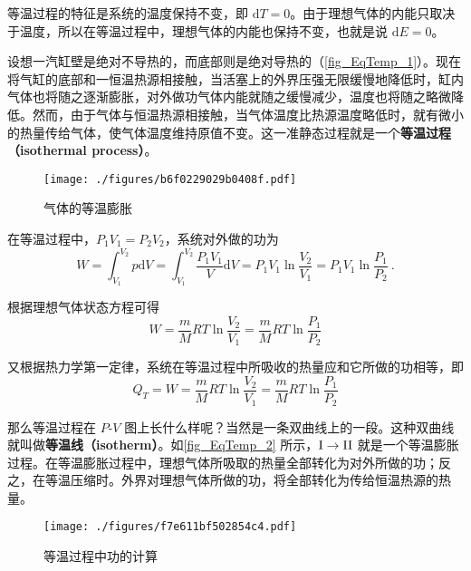 

等温过程的特征是系统的温度保持不变，即 $\mathrm dT=0$。由于理想气体的内能只取决于温度，所以在等温过程中，理想气体的内能也保持不变，也就是说 $\mathrm dE=0$。

设想一汽缸壁是绝对不导热的，而底部则是绝对导热的（\autoref{fig_EqTemp_1}）。现在将气缸的底部和一恒温热源相接触，当活塞上的外界压强无限缓慢地降低时，缸内气体也将随之逐渐膨胀，对外做功气体内能就随之缓慢减少，温度也将随之略微降低。然而，由于气体与恒温热源相接触，当气体温度比热源温度略低时，就有微小的热量传给气体，使气体温度维持原值不变。这一准静态过程就是一个\textbf{等温过程（isothermal process）}。
\begin{figure}[ht]
\centering
\texttt{[image: ./figures/b6f0229029b0408f.pdf]}
\caption{气体的等温膨胀} \label{fig_EqTemp_1}
\end{figure}

在等温过程中，$P_1V_1=P_2V_2$，系统对外做的功为
\begin{equation}
W= \int_{V_{1}}^{V_{2}} p \mathrm{d} V=\int_{V_{1}}^{V_{2}} \frac{P_{1} V_{1}}{V} \mathrm{d} V=P_{1} V_{1} \ln \frac{V_{2}}{V_{1}}=P_{1} V_{1} \ln \frac{P_{1}}{P_{2}}~.
\end{equation}

根据理想气体状态方程可得
\begin{equation}
W=\frac{m}{M} R T \ln \frac{V_{2}}{V_{1}}=\frac{m}{M} R T \ln \frac{P_{1}}{P_{2}}
\end{equation}

又根据热力学第一定律，系统在等温过程中所吸收的热量应和它所做的功相等，即
\begin{equation}\label{eq_EqTemp_1}
Q_{T}=W=\frac{m}{M} R T \ln \frac{V_{2}}{V_{1}}=\frac{m}{M} R T \ln \frac{P_{1}}{P_{2}}
\end{equation}

那么等温过程在 $P$-$V$ 图上长什么样呢？当然是一条双曲线上的一段。这种双曲线就叫做\textbf{等温线（isotherm）}。如\autoref{fig_EqTemp_2} 所示，$\rm I\to II$ 就是一个等温膨胀过程。在等温膨胀过程中，理想气体所吸取的热量全部转化为对外所做的功；反之，在等温压缩时。外界对理想气体所做的功，将全部转化为传给恒温热源的热量。

\begin{figure}[ht]
\centering
\texttt{[image: ./figures/f7e611bf502854c4.pdf]}
\caption{等温过程中功的计算} \label{fig_EqTemp_2}
\end{figure}
